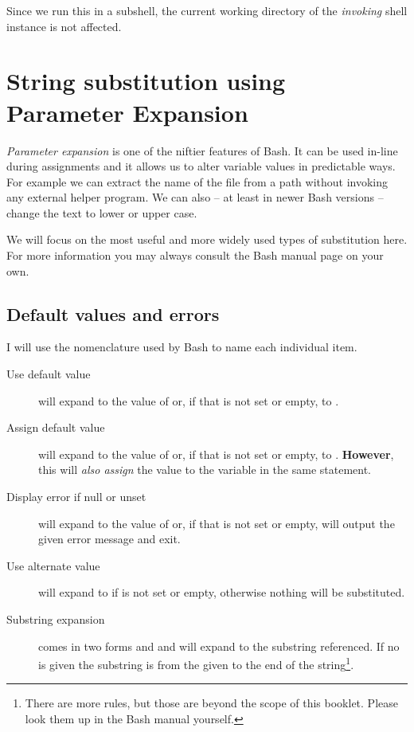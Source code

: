 \documentclass{olli-handout}
\begin{document}
Since we run this in a subshell, the current working directory of the \emph{invoking} shell instance is not affected.

\section{String substitution using Parameter Expansion}

\begin{refmanbash}
\end{refmanbash}

\emph{Parameter expansion} is one of the niftier features of Bash. It can be used in-line during assignments and it allows us to alter variable values in predictable ways. For example we can extract the name of the file from a path without invoking any external helper program. We can also -- at least in newer Bash versions -- change the text to lower or upper case.

We will focus on the most useful and more widely used types of substitution here. For more information you may always consult the Bash manual page on your own.

\subsection{Default values and errors}

I will use the nomenclature used by Bash to name each individual item.

\begin{description}
    \item[Use default value]  will expand to the value of  or, if that is not set or empty, to .
    \item[Assign default value]  will expand to the value of  or, if that is not set or empty, to . \textbf{However}, this will \emph{also assign} the value to the variable in the same statement.
    \item[Display error if null or unset]  will expand to the value of  or, if that is not set or empty, will output the given error message and exit.
    \item[Use alternate value]  will expand to  if  is not set or empty, otherwise nothing will be substituted.
    \item[Substring expansion] comes in two forms  and  and will expand to the substring referenced. If no  is given the substring is from the given  to the end of the string\footnote{There are more rules, but those are beyond the scope of this booklet. Please look them up in the Bash manual yourself.}.
\end{description}
\end{document}
